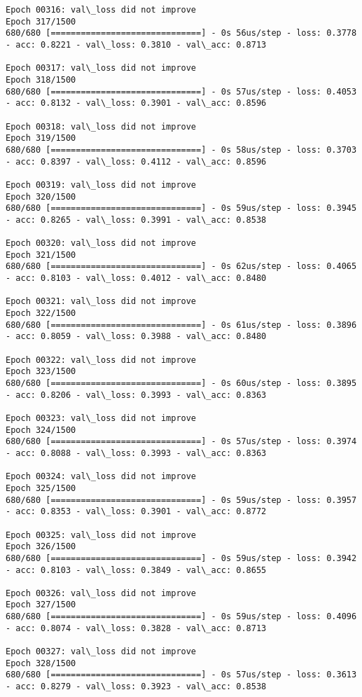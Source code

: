 \documentclass[11pt]{article}
\begin{document}
\begin{Verbatim}[commandchars=\\\{\}]
Epoch 00316: val\_loss did not improve
Epoch 317/1500
680/680 [==============================] - 0s 56us/step - loss: 0.3778 - acc: 0.8221 - val\_loss: 0.3810 - val\_acc: 0.8713

Epoch 00317: val\_loss did not improve
Epoch 318/1500
680/680 [==============================] - 0s 57us/step - loss: 0.4053 - acc: 0.8132 - val\_loss: 0.3901 - val\_acc: 0.8596

Epoch 00318: val\_loss did not improve
Epoch 319/1500
680/680 [==============================] - 0s 58us/step - loss: 0.3703 - acc: 0.8397 - val\_loss: 0.4112 - val\_acc: 0.8596

Epoch 00319: val\_loss did not improve
Epoch 320/1500
680/680 [==============================] - 0s 59us/step - loss: 0.3945 - acc: 0.8265 - val\_loss: 0.3991 - val\_acc: 0.8538

Epoch 00320: val\_loss did not improve
Epoch 321/1500
680/680 [==============================] - 0s 62us/step - loss: 0.4065 - acc: 0.8103 - val\_loss: 0.4012 - val\_acc: 0.8480

Epoch 00321: val\_loss did not improve
Epoch 322/1500
680/680 [==============================] - 0s 61us/step - loss: 0.3896 - acc: 0.8059 - val\_loss: 0.3988 - val\_acc: 0.8480

Epoch 00322: val\_loss did not improve
Epoch 323/1500
680/680 [==============================] - 0s 60us/step - loss: 0.3895 - acc: 0.8206 - val\_loss: 0.3993 - val\_acc: 0.8363

Epoch 00323: val\_loss did not improve
Epoch 324/1500
680/680 [==============================] - 0s 57us/step - loss: 0.3974 - acc: 0.8088 - val\_loss: 0.3993 - val\_acc: 0.8363

Epoch 00324: val\_loss did not improve
Epoch 325/1500
680/680 [==============================] - 0s 59us/step - loss: 0.3957 - acc: 0.8353 - val\_loss: 0.3901 - val\_acc: 0.8772

Epoch 00325: val\_loss did not improve
Epoch 326/1500
680/680 [==============================] - 0s 59us/step - loss: 0.3942 - acc: 0.8103 - val\_loss: 0.3849 - val\_acc: 0.8655

Epoch 00326: val\_loss did not improve
Epoch 327/1500
680/680 [==============================] - 0s 59us/step - loss: 0.4096 - acc: 0.8074 - val\_loss: 0.3828 - val\_acc: 0.8713

Epoch 00327: val\_loss did not improve
Epoch 328/1500
680/680 [==============================] - 0s 57us/step - loss: 0.3613 - acc: 0.8279 - val\_loss: 0.3923 - val\_acc: 0.8538


\end{Verbatim}
\end{document}
